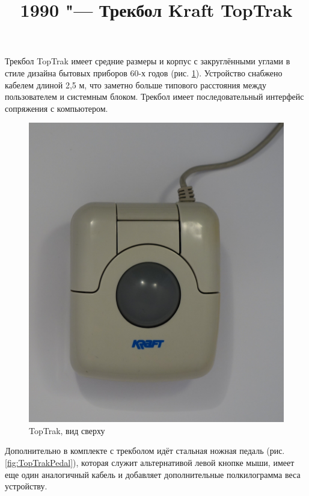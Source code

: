 \documentclass[11pt, a4paper]{article}
\begin{document}
\title{1990 "--- Трекбол Kraft TopTrak}
\date{}
\maketitle

Трекбол TopTrak имеет средние размеры и корпус с закруглёнными углами в стиле дизайна бытовых приборов 60-х годов (рис. \ref{fig:TopTrakTop}). Устройство снабжено кабелем длиной 2,5 м, что заметно больше типового расстояния между пользователем и системным блоком. Трекбол имеет последовательный интерфейс сопряжения с компьютером.

\begin{figure}[h]
    \centering
    \includegraphics[scale=0.55]{1990_kraft_toptrack/2.9.jpg}
    \caption{TopTrak, вид сверху}
    \label{fig:TopTrakTop}
\end{figure}

Дополнительно в комплекте с трекболом идёт стальная ножная педаль (рис. \ref{fig:TopTrakPedal}), которая служит альтернативой левой кнопке мыши, имеет еще один аналогичный кабель и добавляет дополнительные полкилограмма веса устройству.
\end{document}
